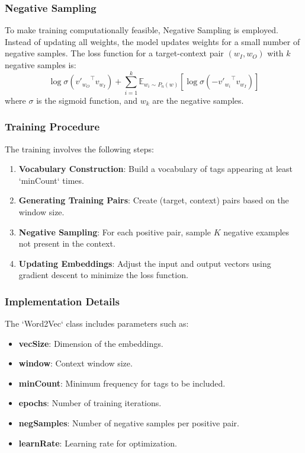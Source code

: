 \documentclass[nonacm, sigconf]{acmart}
\begin{document}
\subsubsection{Negative Sampling}
To make training computationally feasible, Negative Sampling is employed. Instead of updating all weights, the model updates weights for a small number of negative samples\cite{mikolov2013distributed, tensorflow_word2vec_docs}. The loss function for a target-context pair $(w_I, w_O)$ with $k$ negative samples is:
 \begin{equation}
   \log \sigma({v'_{w_O}}^\top v_{w_I}) + \sum_{i=1}^k\mathbb E_{w_i\sim
    P_n(w)}\left[\log \sigma(-{v'_{w_i}}^\top v_{w_I})\right]
 \end{equation}
where $\sigma$ is the sigmoid function, and $w_k$ are the negative samples.

\subsubsection{Training Procedure}
The training involves the following steps:

\begin{enumerate}
    \item \textbf{Vocabulary Construction}: Build a vocabulary of tags appearing at least `minCount` times.
    \item \textbf{Generating Training Pairs}: Create (target, context) pairs based on the window size.
    \item \textbf{Negative Sampling}: For each positive pair, sample $K$ negative examples not present in the context.
    \item \textbf{Updating Embeddings}: Adjust the input and output vectors using gradient descent to minimize the loss function.
\end{enumerate}

\subsubsection{Implementation Details}
The `Word2Vec` class includes parameters such as:
\begin{itemize}
    \item \textbf{vecSize}: Dimension of the embeddings.
    \item \textbf{window}: Context window size.
    \item \textbf{minCount}: Minimum frequency for tags to be included.
    \item \textbf{epochs}: Number of training iterations.
    \item \textbf{negSamples}: Number of negative samples per positive pair.
    \item \textbf{learnRate}: Learning rate for optimization.
\end{itemize}
\end{document}
